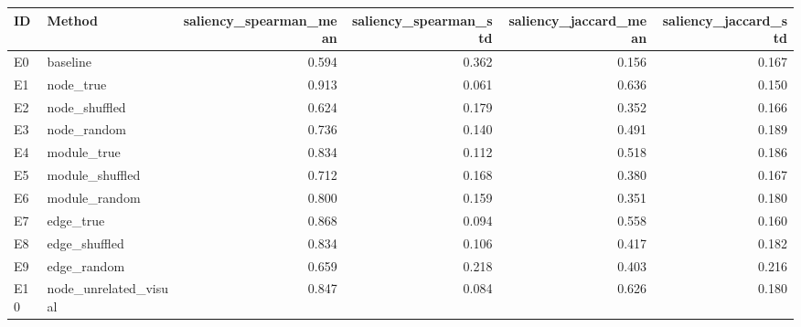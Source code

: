 \begin{tabular}{llrrrr}
\toprule
ID & Method & saliency_spearman_mean & saliency_spearman_std & saliency_jaccard_mean & saliency_jaccard_std \\
\midrule
E0 & baseline & 0.594 & 0.362 & 0.156 & 0.167 \\
E1 & node_true & 0.913 & 0.061 & 0.636 & 0.150 \\
E2 & node_shuffled & 0.624 & 0.179 & 0.352 & 0.166 \\
E3 & node_random & 0.736 & 0.140 & 0.491 & 0.189 \\
E4 & module_true & 0.834 & 0.112 & 0.518 & 0.186 \\
E5 & module_shuffled & 0.712 & 0.168 & 0.380 & 0.167 \\
E6 & module_random & 0.800 & 0.159 & 0.351 & 0.180 \\
E7 & edge_true & 0.868 & 0.094 & 0.558 & 0.160 \\
E8 & edge_shuffled & 0.834 & 0.106 & 0.417 & 0.182 \\
E9 & edge_random & 0.659 & 0.218 & 0.403 & 0.216 \\
E10 & node_unrelated_visual & 0.847 & 0.084 & 0.626 & 0.180 \\
\bottomrule
\end{tabular}
